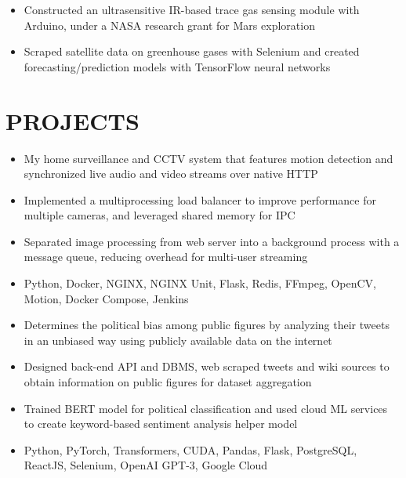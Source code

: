 \documentclass[11pt,letterpaper]{article}
\begin{document}
  \begin{itemize}
    \item{Constructed an ultrasensitive IR-based trace gas sensing module with Arduino, under a NASA research grant for Mars exploration}
    \item{Scraped satellite data on greenhouse gases with Selenium and created forecasting/prediction models with TensorFlow neural networks}
  \end{itemize}

  \smallskip


  \section*{PROJECTS}

  \ifguardian
    {\fontsize{12}{12}}

    \begin{itemize}
      \item{My home surveillance and CCTV system that features motion detection and synchronized live audio and video streams over native HTTP}
      \item{Implemented a multiprocessing load balancer to improve performance for multiple cameras, and leveraged shared memory for IPC}
      \item{Separated image processing from web server into a background process with a message queue, reducing overhead for multi-user streaming}
      \item{
        {}
        Python, Docker, NGINX, NGINX Unit, Flask, Redis, FFmpeg, OpenCV, Motion, Docker Compose, Jenkins
      }
    \end{itemize}
  \fi

  \ifpolitify
    {\fontsize{12}{12}}

    \begin{itemize}
      \item{Determines the political bias among public figures by analyzing their tweets in an unbiased way using publicly available data on the internet}
      \item{Designed back-end API and DBMS, web scraped tweets and wiki sources to obtain information on public figures for dataset aggregation}
      \item{Trained BERT model for political classification and used cloud ML services to create keyword-based sentiment analysis helper model}
      \item{
        {}
        Python, PyTorch, Transformers, CUDA, Pandas, Flask, PostgreSQL, ReactJS, Selenium, OpenAI GPT-3, Google Cloud
      }
    \end{itemize}
  \fi
\end{document}
